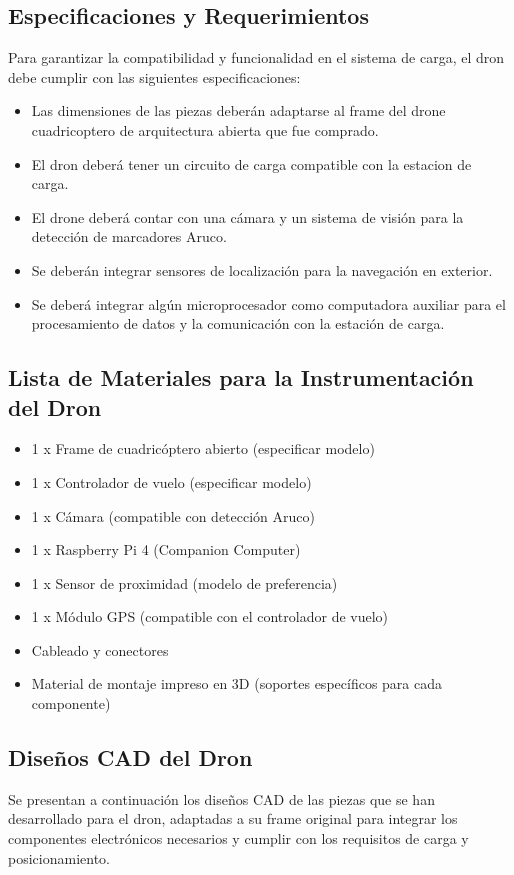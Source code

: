 \subsection{Especificaciones y Requerimientos}
Para garantizar la compatibilidad y funcionalidad en el sistema de carga, el dron debe cumplir con las siguientes especificaciones:
    \begin{itemize}
        \item Las dimensiones de las piezas deberán adaptarse al frame del drone cuadricoptero de arquitectura abierta que fue comprado.
        \item El dron deberá tener un circuito de carga compatible con la estacion de carga.
        \item El drone deberá contar con una cámara y un sistema de visión para la detección de marcadores Aruco.
        \item Se deberán integrar sensores de localización para la navegación en exterior.
        \item Se deberá integrar algún microprocesador como computadora auxiliar para el procesamiento de datos y la comunicación con la estación de carga.
    \end{itemize}

\subsection{Lista de Materiales para la Instrumentación del Dron} 
    \begin{itemize} 
        \item 1 x Frame de cuadricóptero abierto (especificar modelo) 
        \item 1 x Controlador de vuelo (especificar modelo) 
        \item 1 x Cámara (compatible con detección Aruco) 
        \item 1 x Raspberry Pi 4 (Companion Computer) 
        \item 1 x Sensor de proximidad (modelo de preferencia) 
        \item 1 x Módulo GPS (compatible con el controlador de vuelo) 
        \item Cableado y conectores 
        \item Material de montaje impreso en 3D (soportes específicos para cada componente) 
    \end{itemize}

\subsection{Diseños CAD del Dron} 
Se presentan a continuación los diseños CAD de las piezas que se han desarrollado para el dron, adaptadas a su frame original para integrar los componentes electrónicos necesarios y cumplir con los requisitos de carga y posicionamiento.


